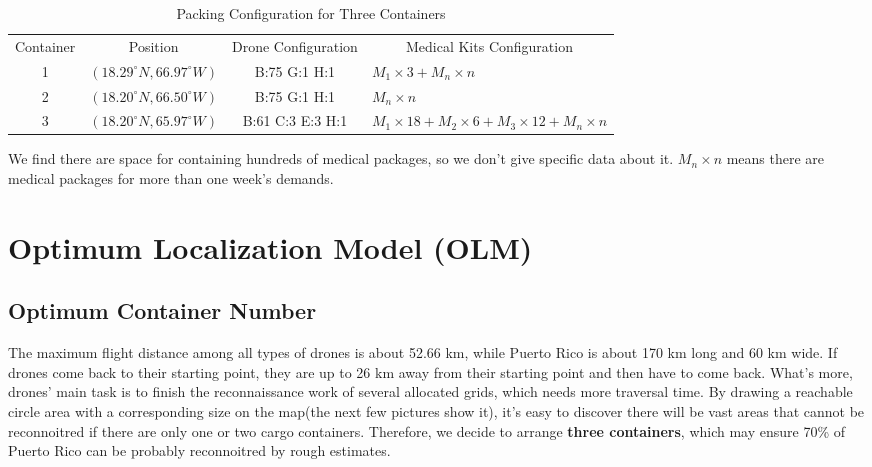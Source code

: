 \documentclass{mcmthesis}
\begin{document}
\begin{table}[H]
	\centering

	\begin{tabular}{llll}
		\cline{1-4}
		
		\multicolumn{1}{c}{Container}  & \multicolumn{1}{c}{Position} & \multicolumn{1}{c}{Drone Configuration} & \multicolumn{1}{c}{Medical Kits Configuration} \\ 
		\cline{1-4}
		
		\multicolumn{1}{c}{1} & \multicolumn{1}{c}{$(18.29^\circ N, 66.97^\circ W)$} & \multicolumn{1}{c}{B:75 G:1 H:1}    &  $M_1\times3+M_n\times n$     \\
		\multicolumn{1}{c}{2} & \multicolumn{1}{c}{$(18.20^\circ N, 66.50^\circ W)$} & \multicolumn{1}{c}{B:75 G:1 H:1}   &   $M_n \times n$      \\
		\multicolumn{1}{c}{3} & \multicolumn{1}{c}{$(18.20^\circ N, 65.97^\circ W)$}  &\multicolumn{1}{c}{B:61 C:3 E:3 H:1}   &  $M_1\times 18+M_2\times 6 +M_3 \times 12 +M_n\times n$ \\ 
		
		\cline{1-4}
		
	\end{tabular}
	\caption{Packing Configuration for Three Containers}
		\label{pctc}
\end{table}
We find there are space for containing hundreds of medical packages, so we don't give specific data about it. $M_n \times n$ means there are medical packages for more than one week's demands.
	
    
    
    \section{Optimum Localization Model (OLM)} \label{ols}
    
    \subsection{Optimum Container Number}
    The maximum flight distance among all types of drones is about 52.66 km, while Puerto Rico is about 170 km long and 60 km wide. If drones come back to their starting point, they are up to 26 km away from their starting point and then have to come back. What's more, drones' main task is to finish the reconnaissance work of several allocated grids, which needs more traversal time. By drawing a reachable circle area with a corresponding size on the map(the next few pictures show it), it's easy to discover there will be vast areas that cannot be reconnoitred if there are only one or two cargo containers. Therefore, we decide to arrange \textbf{three containers}, which may ensure 70\% of Puerto Rico can be probably reconnoitred by rough estimates. 
    
\end{document}
